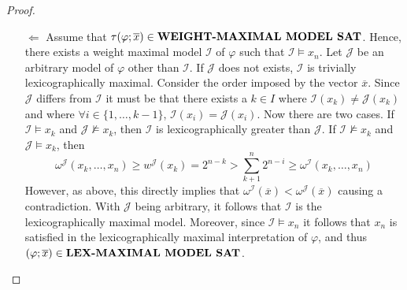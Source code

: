 \documentclass [11pt]{article}
\newcommand{\MAXWEIGHTSAT}{\mbox{\bf WEIGHT-MAXIMAL MODEL SAT}}
\newcommand{\MAXLEXSAT}{\mbox{\bf LEX-MAXIMAL MODEL SAT}}
\newcommand{\nmodels}{\not\models}
\begin{document}
\begin{proof}
\begin{itemize}
\item[$\Leftarrow$]
Assume that $\tau(\varphi;\overline{x}) \in \MAXWEIGHTSAT$. Hence, there exists a weight maximal model $\mathcal{I}$ of $\varphi$ such that $\mathcal{I}\models x_n$. Let $\mathcal{J}$ be an arbitrary model of $\varphi$ other than $\mathcal{I}$. If $\mathcal{J}$ does not exists, $\mathcal{I}$ is trivially lexicographically maximal. Consider the order imposed by the vector $\overline{x}$. Since $\mathcal{J}$ differs from $\mathcal{I}$ it must be that there exists a $k \in I $ where $\mathcal{I}(x_k)\neq \mathcal{J}(x_k)$ and where $\forall i  \in \{1,\dots , k-1 \}$, $\mathcal{I}(x_i)=\mathcal{J}(x_i)$. Now there are two cases. If $\mathcal{I} \models x_k $ and $\mathcal{J} \nmodels x_k$, then $\mathcal{I}$ is lexicographically greater than $\mathcal{J}$. If $\mathcal{I} \nmodels x_k $ and $\mathcal{J} \models x_k$, then
\begin{equation*}
\omega^{\mathcal{J}}(x_{k}, \dots , x_n) \geq w^{\mathcal{J}}(x_k)=2^{n-k}> \sum_{k+1}^n 2^{n-i}\geq \omega^{\mathcal{I}}(x_{k}, \dots , x_n)
\end{equation*}
However, as above, this directly implies that $\omega^{\mathcal{I}}(\overline{x}) < \omega^\mathcal{J}(\overline{x})$ causing a contradiction.
With $\mathcal{J}$ being arbitrary, it follows that $\mathcal{I}$ is the lexicographically maximal model. Moreover, since $\mathcal{I}\models x_n$ it follows that $x_n$ is satisfied in the lexicographically maximal interpretation of $\varphi$, and thus $(\varphi;\overline{x}) \in \MAXLEXSAT$.


\end{itemize}

\end{proof}
\end{document}
